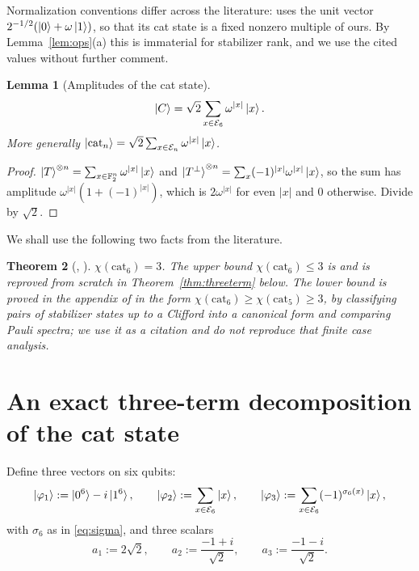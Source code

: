 \documentclass[11pt]{article}
\theoremstyle{plain}
\newtheorem{theorem}{Theorem}[section]
\newtheorem{lemma}[theorem]{Lemma}
\theoremstyle{definition}
\newcommand{\F}{\mathbb{F}}
\newcommand{\cat}{\mathrm{cat}}
\newcommand{\Ev}{\mathcal{E}}
\newcommand{\wt}[1]{\lvert #1\rvert}
\begin{document}
Normalization conventions differ across the literature: \cite{QPG2021} uses the unit
vector $2^{-1/2}(\ket0+\omega\ket1)$, so that its cat state is a fixed nonzero multiple
of ours. By Lemma~\ref{lem:ops}(a) this is immaterial for stabilizer rank, and we use
the cited values without further comment.

\begin{lemma}[Amplitudes of the cat state]\label{lem:catamp}
\begin{equation}\label{eq:catamp}
\ket C=\sqrt2\sum_{x\in\Ev_6}\omega^{\wt x}\ket x .
\end{equation}
More generally $\ket{\cat_n}=\sqrt2\sum_{x\in\Ev_n}\omega^{\wt x}\ket x$.
\end{lemma}

\begin{proof}
$\ket T^{\otimes n}=\sum_{x\in\F_2^n}\omega^{\wt x}\ket x$ and
$\ket{T^\perp}^{\otimes n}=\sum_x(-1)^{\wt x}\omega^{\wt x}\ket x$, so the sum has
amplitude $\omega^{\wt x}(1+(-1)^{\wt x})$, which is $2\omega^{\wt x}$ for even
$\wt x$ and $0$ otherwise. Divide by $\sqrt2$.
\end{proof}

We shall use the following two facts from the literature.

\begin{theorem}[{\cite[\S4.2]{QassimThesis}, \cite{QPG2021}}]\label{thm:cited}
$\chi(\cat_6)=3$. The upper bound $\chi(\cat_6)\le3$ is
\cite[\S4.2]{QassimThesis} and is reproved from scratch in
Theorem~\ref{thm:threeterm} below. The lower bound is proved in the appendix of
\cite{QPG2021} in the form $\chi(\cat_6)\ge\chi(\cat_5)\ge3$, by classifying pairs of
stabilizer states up to a Clifford into a canonical form and comparing Pauli spectra;
we use it as a citation and do not reproduce that finite case analysis.
\end{theorem}

\section{An exact three-term decomposition of the cat state}\label{sec:three}

Define three vectors on six qubits:
\begin{equation}\label{eq:phis}
\ket{\varphi_1}:=\ket{0^6}-i\ket{1^6},\qquad
\ket{\varphi_2}:=\sum_{x\in\Ev_6}\ket x,\qquad
\ket{\varphi_3}:=\sum_{x\in\Ev_6}(-1)^{\sigma_6(x)}\ket x ,
\end{equation}
with $\sigma_6$ as in \eqref{eq:sigma}, and three scalars
\begin{equation}\label{eq:as}
a_1:=2\sqrt2,\qquad a_2:=\frac{-1+i}{\sqrt2},\qquad a_3:=\frac{-1-i}{\sqrt2}.
\end{equation}
\end{document}
